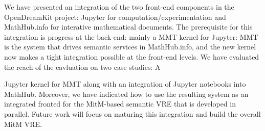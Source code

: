 
We have presented an integration of the two front-end components in the OpenDreamKit project: Jupyter for computation/experimentation and MathHub.info for interative mathematical documents. The prerequisite for this integration is progress at the back-end: mainly a MMT kernel for Jupyter: MMT is the system that drives semantic services in MathHub.info, and the new kernel now makes a tight integration possible at the front-end levels. We have evaluated the reach of the eavluation on two case studies: A 

Jupyter kernel for MMT along with an integration of Jupyter notebooks into MathHub.
Moreover, we have indicated how to use the resulting system as an integrated fronted for the MitM-based semantic VRE that is developed in parallel. 
Future work will focus on maturing this integration and build the overall MitM VRE.



